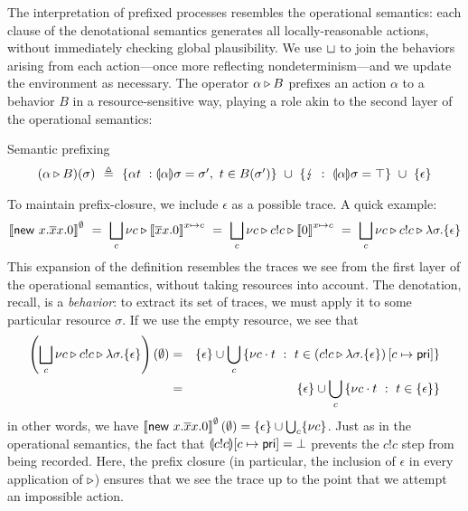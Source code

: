 \documentclass{entcs}
\begin{document}
The interpretation of prefixed processes resembles the operational
semantics: each clause of the denotational semantics generates all
locally-reasonable actions, without immediately checking global
plausibility.  We use $\sqcup$ to join the behaviors arising from each
action---once more reflecting nondeterminism---and we update the
environment as necessary.  The operator $\alpha \triangleright B$ prefixes an
action $\alpha$ to a behavior $B$ in a resource-sensitive way, playing
a role akin to the second layer of the operational semantics:
\begin{display}
{Semantic prefixing}
\[
\begin{array}{r@{\ \ \eqdef\ \ }l}
(\alpha \pref B)(\sigma) &
         \{ \alpha t\ : \ASem{\alpha}{\sigma} = \sigma',\ t \in B(\sigma') \} 
\ \cup\  \{ \fault\ :\ \ASem{\alpha}{\sigma} = \top \} 
\ \cup\  \{ \epsilon \} 
\end{array}
\]
\end{display}
To maintain prefix-closure, we include $\epsilon$ as a possible trace.
A quick example: 
\[ 
  \left\llbracket \textsf{new } x. \overline{x}x.0 \right\rrbracket^{\emptyset}
\ =\
  \bigsqcup_c \nu c \triangleright \left\llbracket \overline{x}x.0 \right\rrbracket^{x \mapsto c}
\ =\
  \bigsqcup_c \nu c \triangleright c!c \triangleright \left\llbracket 0 \right\rrbracket^{x \mapsto c}
\ =\
  \bigsqcup_c \nu c \triangleright c!c \triangleright \lambda \sigma. \{ \epsilon \}
\]
This expansion of the definition resembles the traces we see from the
first layer of the operational semantics, without taking resources
into account.  The denotation, recall, is a \emph{behavior}: to
extract its set of traces, we must apply it to some particular
resource $\sigma$.  If we use the empty resource, we see that
\begin{eqnarray*}
  \left(\biglub_c \nu c \pref c!c \pref \lambda \sigma. \{ \epsilon \}\right)(\emptyset)
&=&
  \{ \epsilon \} \cup \bigcup_c \left\{ \nu c \cdot t\ :\ 
    t \in \left(c!c\pref \lambda \sigma. \{\epsilon\}\right)[c\mapsto \pri] \right\} \\
&=&
  \{ \epsilon \} \cup \bigcup_c \left\{ \nu c \cdot t\ :\ 
    t \in \{ \epsilon \} \right\} 
\end{eqnarray*}
in other words, we have $\left\llbracket \textsf{new } x. \overline{x}x.0 \right\rrbracket^{\emptyset}(\emptyset)
= \{ \epsilon \} \cup \bigcup_c \{ \nu c \}$.  Just as in the
operational semantics, the fact that $\llparenthesis c!c \rrparenthesis [c \mapsto \textsf{pri}] =
\bot$ prevents the $c!c$ step from being recorded.  Here, the prefix
closure (in particular, the inclusion of $\epsilon$ in every
application of $\triangleright$) ensures that we see the trace up to the point
that we attempt an impossible action.
\end{document}
